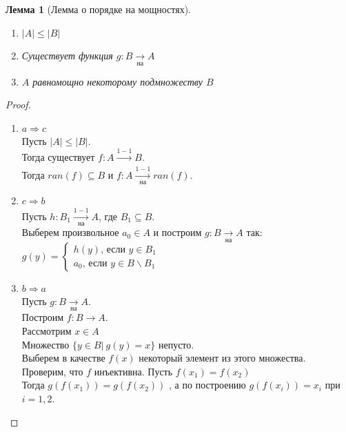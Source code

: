 \documentclass[a4paper]{article}
\newtheorem*{lemma*}{Лемма}
\theoremstyle{definition}
\begin{document}
\begin{enumerate}
\begin{lemma*}[Лемма о порядке на мощностях]
\begin{enumerate}
         \item $\left | A \right | \leq \left | B \right |$
         \item Существует функция $g : B\xrightarrow[\textit{на}]{}A$
         \item $A$ равномощно некоторому подмножеству $B$
        \end{enumerate}
       \end{lemma*}
       \begin{proof}
        \mbox{}\\
        \begin{enumerate}
         \item $a \Rightarrow c$ \\
               Пусть $\left | A \right | \leq \left | B \right |$.\\
               Тогда существует $f : A \xrightarrow[]{1-1} B$. \\
               Тогда $ran(f) \subseteq B$ и $f : A\xrightarrow[\textit{на}]{1-1}ran(f)$.\\
         \item $c \Rightarrow b$ \\
               Пусть $h : B_{1}\xrightarrow[\text{на}]{1-1}A$, где $B_{1}\subseteq B$. \\
               Выберем произвольное $a_{0} \in A$ и построим $g : B\xrightarrow[\text{на}]{}A$ так:
               $g(y) = \left\{\begin{matrix}
                 h(y)\text{, если } y \in B_{1} \\
                 a_{0}\text{, если }y \in B\backslash B_{1}
                \end{matrix}\right.$
         \item $b \Rightarrow a$ \\
               Пусть $g : B\xrightarrow[\text{на}]{ }A$.\\
               Построим $f : B\rightarrow A$.\\
               Рассмотрим $x\in A$\\
               Множество $\{y\in B |\ g(y) = x\}$ непусто.\\
               Выберем в качестве $f(x)$ некоторый элемент из этого множества. Проверим, что $f$ инъективна. Пусть $f(x_{1}) = f(x_{2})$\\
               Тогда $g(f(x_{1})) = g(f(x_{2}))$ , а по построению $g(f(x_{i})) = x_{i}$ при $i = 1,2.$
        \end{enumerate}
       \end{proof}

\end{enumerate}
\end{document}
